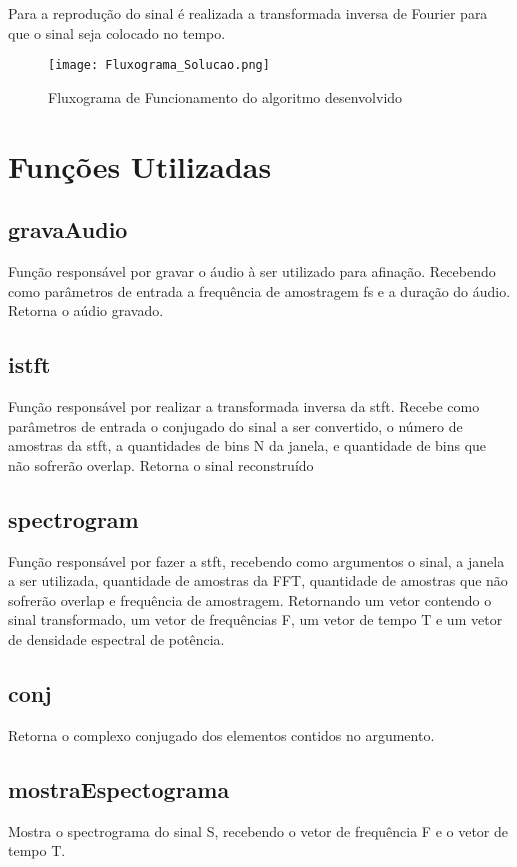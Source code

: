 Para a reprodução do sinal é realizada a transformada inversa de Fourier para que o sinal seja colocado no tempo.

\begin{figure}[h]
	\centering
	\texttt{[image: Fluxograma\_Solucao.png]}
	\label{fig:Fluxograma_Solucao}
	\caption{Fluxograma de Funcionamento do algoritmo desenvolvido}
\end{figure}

\section*{Funções Utilizadas}
\subsection*{gravaAudio}
Função responsável por gravar o áudio à ser utilizado para afinação. Recebendo como parâmetros de entrada a frequência de amostragem fs e a duração do áudio. Retorna o aúdio gravado.

\subsection*{istft}
Função responsável por realizar a transformada inversa da stft. Recebe como parâmetros de entrada o conjugado do sinal a ser convertido, o número de amostras da stft, a quantidades de bins N da janela, e quantidade de bins que não sofrerão overlap. Retorna o sinal reconstruído

\subsection*{spectrogram}
Função responsável por fazer a stft, recebendo como argumentos  o sinal, a janela a ser utilizada, quantidade de amostras da FFT, quantidade de amostras que não sofrerão overlap e frequência de amostragem. Retornando um vetor contendo o sinal transformado, um vetor de frequências F, um vetor de tempo T e um vetor de densidade espectral de potência.

\subsection*{conj}
Retorna o complexo conjugado dos elementos contidos no argumento.


\subsection*{mostraEspectograma}
Mostra o spectrograma do sinal S, recebendo o vetor de frequência F e o vetor de tempo T.

